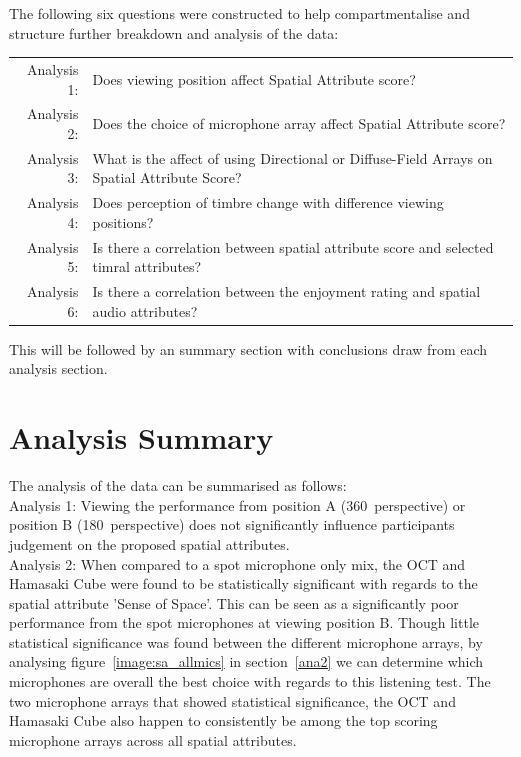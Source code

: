 	The following six questions were constructed to help compartmentalise and structure further breakdown and analysis of the data: \\

	\begin{tabular}{r p{5.5cm}}
		Analysis 1: & Does viewing position affect Spatial Attribute score? \\
		Analysis 2: & Does the choice of microphone array affect Spatial Attribute score? \\
		Analysis 3: & What is the affect of using Directional or Diffuse-Field Arrays on Spatial Attribute Score? \\ 
		Analysis 4: & Does perception of timbre change with difference viewing positions? \\
		Analysis 5: & Is there a correlation between spatial attribute score and selected timral attributes? \\
		Analysis 6: & Is there a correlation between the enjoyment rating and spatial audio attributes?
	\end{tabular}

	This will be followed by an summary section with conclusions draw from each analysis section.

	
	
	
	
	
	

	\section{Analysis Summary}

		The analysis of the data can be summarised as follows:\\

		Analysis 1: Viewing the performance from position A (360\textdegree~perspective) or position B (180\textdegree~perspective) does not significantly influence participants judgement on the proposed spatial attributes. \\

		Analysis 2: When compared to a spot microphone only mix, the OCT and Hamasaki Cube were found to be statistically significant with regards to the spatial attribute 'Sense of Space'. This can be seen as a significantly poor performance from the spot microphones at viewing position B. Though little statistical significance was found between the different microphone arrays, by analysing figure~\ref{image:sa_allmics} in section~\ref{ana2} we can determine which microphones are overall the best choice with regards to this listening test. The two microphone arrays that showed statistical significance, the OCT and Hamasaki Cube also happen to consistently be among the top scoring microphone arrays across all spatial attributes. \\

